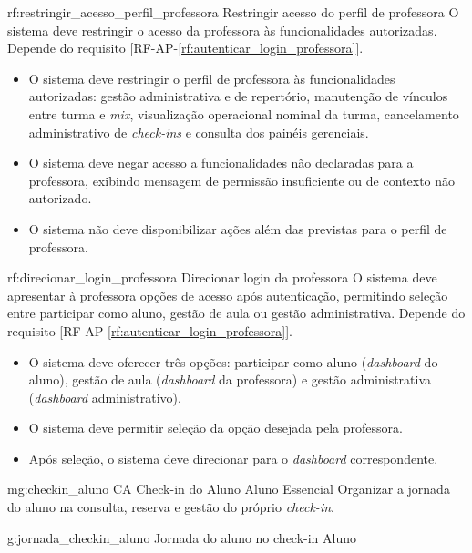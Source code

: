 \reqfunc
{rf:restringir_acesso_perfil_professora}
{Restringir acesso do perfil de professora}
{O sistema deve restringir o acesso da professora às funcionalidades autorizadas.}
{Depende do requisito [RF-AP-\ref{rf:autenticar_login_professora}].}
{\begin{itemize}[leftmargin=0.6cm]
    \item O sistema deve restringir o perfil de professora às funcionalidades autorizadas: gestão administrativa e de repertório, manutenção de vínculos entre turma e \textit{mix}, visualização operacional nominal da turma, cancelamento administrativo de \textit{check-ins} e consulta dos painéis gerenciais.
    \item O sistema deve negar acesso a funcionalidades não declaradas para a professora, exibindo mensagem de permissão insuficiente ou de contexto não autorizado.
    \item O sistema não deve disponibilizar ações além das previstas para o perfil de professora.
\end{itemize}}

\reqfunc
{rf:direcionar_login_professora}
{Direcionar login da professora}
{O sistema deve apresentar à professora opções de acesso após autenticação, permitindo seleção entre participar como aluno, gestão de aula ou gestão administrativa.}
{Depende do requisito [RF-AP-\ref{rf:autenticar_login_professora}].}
{\begin{itemize}[leftmargin=0.6cm]
    \item O sistema deve oferecer três opções: participar como aluno (\textit{dashboard} do aluno), gestão de aula (\textit{dashboard} da professora) e gestão administrativa (\textit{dashboard} administrativo).
    \item O sistema deve permitir seleção da opção desejada pela professora.
    \item Após seleção, o sistema deve direcionar para o \textit{dashboard} correspondente.
\end{itemize}}

\rfmacrogrupo
{mg:checkin_aluno}
{CA}
{Check-in do Aluno}
{Aluno}
{Essencial}
{Organizar a jornada do aluno na consulta, reserva e gestão do próprio \textit{check-in}.}

\rfgruporeqator
{g:jornada_checkin_aluno}
{Jornada do aluno no check-in}
{Aluno}

